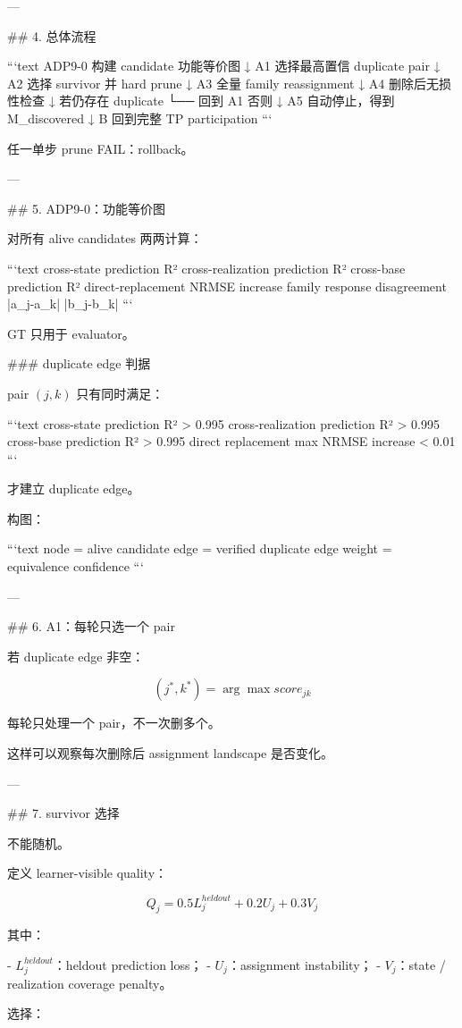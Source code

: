 ---

## 4. 总体流程

```text
ADP9-0  构建 candidate 功能等价图
   ↓
A1      选择最高置信 duplicate pair
   ↓
A2      选择 survivor 并 hard prune
   ↓
A3      全量 family reassignment
   ↓
A4      删除后无损性检查
   ↓
若仍存在 duplicate
   └── 回到 A1
否则
   ↓
A5      自动停止，得到 M_discovered
   ↓
B       回到完整 TP participation
```

任一单步 prune FAIL：rollback。

---

## 5. ADP9-0：功能等价图

对所有 alive candidates 两两计算：

```text
cross-state prediction R²
cross-realization prediction R²
cross-base prediction R²
direct-replacement NRMSE increase
family response disagreement
|a_j-a_k|
|b_j-b_k|
```

GT 只用于 evaluator。

### duplicate edge 判据

pair \((j,k)\) 只有同时满足：

```text
cross-state prediction R² > 0.995
cross-realization prediction R² > 0.995
cross-base prediction R² > 0.995
direct replacement max NRMSE increase < 0.01
```

才建立 duplicate edge。

构图：

```text
node = alive candidate
edge = verified duplicate
edge weight = equivalence confidence
```

---

## 6. A1：每轮只选一个 pair

若 duplicate edge 非空：

\[
(j^*,k^*)
=
\arg\max score_{jk}
\]

每轮只处理一个 pair，不一次删多个。

这样可以观察每次删除后 assignment landscape 是否变化。

---

## 7. survivor 选择

不能随机。

定义 learner-visible quality：

\[
Q_j
=
0.5L_j^{heldout}
+
0.2U_j
+
0.3V_j
\]

其中：

- \(L_j^{heldout}\)：heldout prediction loss；
- \(U_j\)：assignment instability；
- \(V_j\)：state / realization coverage penalty。

选择：

